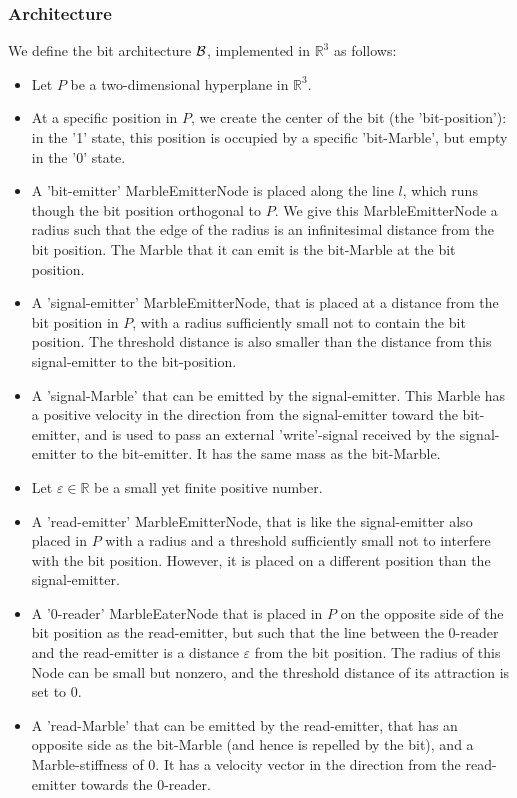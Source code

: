 \subsubsection{Architecture}
We define the bit architecture $\mathcal{B}$, implemented in $\mathbb{R}^3$ as follows:
\begin{itemize}
    \item Let $P$ be a two-dimensional hyperplane in $\mathbb{R}^3$.
    \item At a specific position in $P$, we create the center of the bit (the 'bit-position'): in the '1' state, this position is occupied by a specific 'bit-Marble', but empty in the '0' state.
    \item A 'bit-emitter' MarbleEmitterNode is placed along the line $l$, which runs though the bit position orthogonal to $P$. We give this MarbleEmitterNode a radius such that the edge of the radius is an infinitesimal distance from the bit position. The Marble that it can emit is the bit-Marble at the bit position.
    \item A 'signal-emitter' MarbleEmitterNode, that is placed at a distance from the bit position in $P$, with a radius sufficiently small not to contain the bit position. The threshold distance is also smaller than the distance from this signal-emitter to the bit-position.
    \item A 'signal-Marble' that can be emitted by the signal-emitter. This Marble has a positive velocity in the direction from the signal-emitter toward the bit-emitter, and is used to pass an external 'write'-signal received by the signal-emitter to the bit-emitter. It has the same mass as the bit-Marble.
    \item Let $\varepsilon \in \mathbb{R}$ be a small yet finite positive number.
    \item A 'read-emitter' MarbleEmitterNode, that is like the signal-emitter also placed in $P$ with a radius and a threshold sufficiently small not to interfere with the bit position. However, it is placed on a different position than the signal-emitter. 
    \item A '0-reader' MarbleEaterNode that is placed in $P$ on the opposite side of the bit position as the read-emitter, but such that the line between the 0-reader and the read-emitter is a distance $\varepsilon$ from the bit position. The radius of this Node can be small but nonzero, and the threshold distance of its attraction is set to 0.
    \item A 'read-Marble' that can be emitted by the read-emitter, that has an opposite side as the bit-Marble (and hence is repelled by the bit), and a Marble-stiffness of 0. It has a velocity vector in the direction from the read-emitter towards the 0-reader.

\end{itemize}
